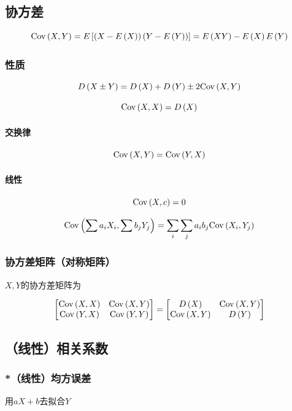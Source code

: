 \documentclass{article}
\begin{document}
\subsection{协方差}

\[\cov XY=E\left[\p{X-\ex}\p{Y-E\p{Y}}\right]=E\p{XY}-\ex E\p{Y}\]

\subsubsection{性质}

\[D\p{X\pm Y}=D\p{X}+D\p{Y}\pm2\cov XY\]

\[\cov XX=D\p{X}\]

\paragraph{交换律}

\[\cov XY=\cov YX\]

\paragraph{线性}

\[\cov Xc=0\]

\[\cov{\sum a_iX_i}{\sum b_jY_j}=\sum_i\sum_ja_ib_j\cov{X_i}{Y_j}\]

\subsubsection{协方差矩阵（对称矩阵）}

$X,Y$的协方差矩阵为

\[\begin{bmatrix}
        \cov XX & \cov XY \\
        \cov YX & \cov YY
    \end{bmatrix}=
    \begin{bmatrix}
        D\p{X}  & \cov XY \\
        \cov XY & D\p{Y}
    \end{bmatrix}\]

\subsection{（线性）相关系数}

\subsubsection{*（线性）均方误差}

用$aX+b$去拟合$Y$
\end{document}
